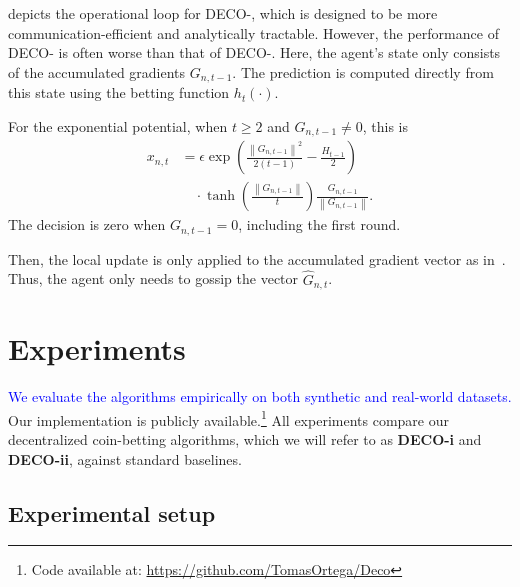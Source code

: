 \documentclass[journal]{IEEEtran}
\newcommand{\br}[1]{\left(#1\right)}
\newcommand{\norm}[1]{\left\lVert{#1}\right\rVert}
\newcommand{\algname}{{DECO}\xspace}
\begin{document}
 depicts the operational loop for \algname{}-, which is designed to be more communication-efficient and analytically tractable.
However, the performance of \algname{}- is often worse than that of \algname{}-.
Here, the agent's state only consists of the accumulated gradients $G_{n,t-1}$.
The prediction is computed directly from this state using the betting function $h_t(\cdot)$.
    {\color{blue}
        For the exponential potential, when $t\geq2$ and $G_{n,t-1}\neq0$, this is
        \begin{equation}
            \begin{aligned}
                x_{n,t}
                 & =\epsilon\exp\br{\frac{\norm{G_{n,t-1}}^2}{2(t-1)}-\frac{H_{t-1}}{2}} \\
                 & \quad\cdot\tanh\br{\frac{\norm{G_{n,t-1}}}{t}}
                \frac{G_{n,t-1}}{\norm{G_{n,t-1}}}.
            \end{aligned}\label{eq:deco2_bet_vec}
        \end{equation}
        The decision is zero when $G_{n,t-1}=0$, including the first round.
        \par}
Then, the local update is only applied to the accumulated gradient vector as in~.
Thus, the agent only needs to gossip the vector $\hat{G}_{n,t}$.

\section{Experiments}\label{sec:experiments}

\textcolor{blue}{We evaluate the algorithms empirically on both synthetic and real-world datasets.}
Our implementation is publicly available.\footnote{Code available at: \url{https://github.com/TomasOrtega/Deco}}
All experiments compare our decentralized coin-betting algorithms, which we will refer to as \textbf{\algname{}-i} and \textbf{\algname{}-ii}, against standard baselines.

\subsection{Experimental setup}
\end{document}

